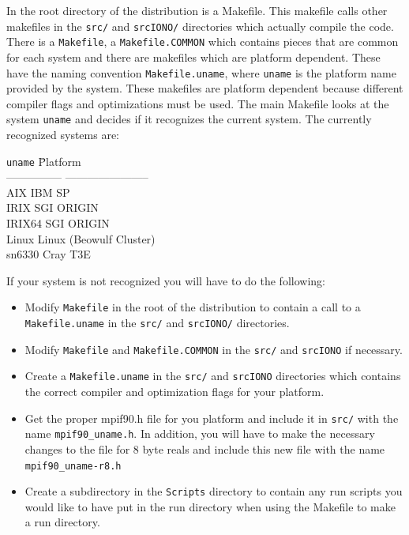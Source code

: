 In the root directory of the distribution is a Makefile.  This makefile calls 
other makefiles in the {\tt src/} and {\tt srcIONO/} directories 
which actually compile the code.  There is a {\tt Makefile}, 
a {\tt Makefile.COMMON} which contains
pieces that are common for each system and there are makefiles which are platform 
dependent.  These have the naming convention 
{\tt Makefile.uname}, where
{\tt uname} is the platform name provided by the system.
These makefiles are platform dependent because different
compiler flags and optimizations must be used.  The main Makefile
looks at the system {\tt uname} and decides if it recognizes the
current system. The currently recognized systems are:
\begin{tabbing}
{\tt uname}      \hspace{.5in} \= Platform                \\
---------------   \> ----------------------- \\
AIX               \> IBM SP                  \\
IRIX              \> SGI ORIGIN              \\
IRIX64            \> SGI ORIGIN              \\
Linux             \> Linux (Beowulf Cluster) \\
sn6330            \> Cray T3E                
\end{tabbing}
If your system is not recognized you will have to do the following:
\begin{itemize}
\item Modify {\tt Makefile} in the root of the distribution to contain
      a call to a {\tt Makefile.uname} in the {\tt src/} and {\tt srcIONO/} 
      directories.
\item Modify {\tt Makefile} and {\tt Makefile.COMMON} in the {\tt src/} and
      {\tt srcIONO} if necessary.
\item Create a  {\tt Makefile.uname} in the {\tt src/}  and {\tt srcIONO}
       directories
      which contains the correct compiler and optimization flags for
      your platform.  
\item Get the proper mpif90.h file for you platform and include it in
      {\tt src/} with the name {\tt mpif90\_uname.h}.  In addition, you will
      have to make the necessary changes to the file for 8 byte reals and 
      include this new file with the name {\tt mpif90\_uname-r8.h}
\item Create a subdirectory in the {\tt Scripts} directory to contain any
      run scripts you would like to have put in the run directory when
      using the Makefile to make a run directory.
\end{itemize}



